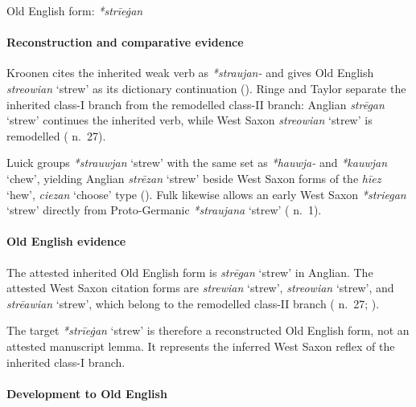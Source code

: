 \documentclass[
  british,
  a4paper,
]{article}
\providecommand{\Recon}[1]{\emph{*#1}}
\begin{document}
Old English form: \emph{*strīeġan}

\paragraph{Reconstruction and comparative
evidence}\label{reconstruction-and-comparative-evidence-146}

Kroonen cites the inherited weak verb as {\emph{*straujan-}} and gives
Old English {\emph{streowian}} `strew' as its dictionary continuation
(). Ringe and Taylor
separate the inherited class-I branch from the remodelled class-II
branch: Anglian {\emph{strēgan}} `strew' continues the inherited verb,
while West Saxon {\emph{streowian}} `strew' is remodelled
(
n.~27).

Luick groups \Recon{strauwjan} `strew' with the same set as
\emph{*hauwja-} and \Recon{kauwjan} `chew', yielding Anglian
{\emph{strēzan}} `strew' beside West Saxon forms of the {\emph{hīez}}
`hew', {\emph{ciezan}} `choose' type (). Fulk likewise allows an early West Saxon
\Recon{striegan} `strew' directly from Proto-Germanic \Recon{straujana}
`strew' ( n.~1).

\paragraph{Old English evidence}\label{old-english-evidence-146}

The attested inherited Old English form is {\emph{strēgan}} `strew' in
Anglian. The attested West Saxon citation forms are {\emph{strewian}}
`strew', {\emph{streowian}} `strew', and {\emph{strēawian}} `strew',
which belong to the remodelled class-II branch
( n.~27;
).

The target \Recon{strīeġan} `strew' is therefore a reconstructed Old
English form, not an attested manuscript lemma. It represents the
inferred West Saxon reflex of the inherited class-I branch.

\paragraph{Development to Old
English}\label{development-to-old-english-146}
\end{document}
